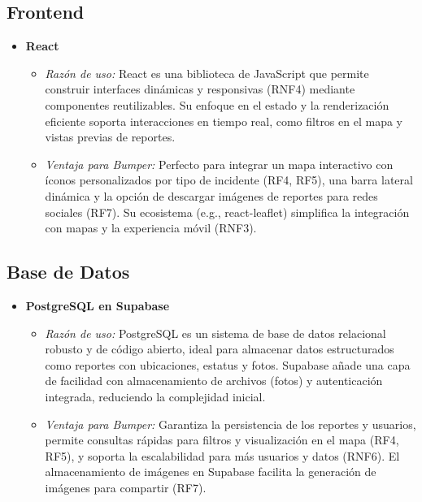 \subsection*{Frontend}
\begin{itemize}
    \item \textbf{React}
    \begin{itemize}
        \item \textit{Razón de uso:} React es una biblioteca de JavaScript que permite construir interfaces dinámicas y responsivas (RNF4) mediante componentes reutilizables. Su enfoque en el estado y la renderización eficiente soporta interacciones en tiempo real, como filtros en el mapa y vistas previas de reportes.
        \item \textit{Ventaja para Bumper:} Perfecto para integrar un mapa interactivo con íconos personalizados por tipo de incidente (RF4, RF5), una barra lateral dinámica y la opción de descargar imágenes de reportes para redes sociales (RF7). Su ecosistema (e.g., react-leaflet) simplifica la integración con mapas y la experiencia móvil (RNF3).
    \end{itemize}
\end{itemize}

\subsection*{Base de Datos}
\begin{itemize}
    \item \textbf{PostgreSQL en Supabase}
    \begin{itemize}
        \item \textit{Razón de uso:} PostgreSQL es un sistema de base de datos relacional robusto y de código abierto, ideal para almacenar datos estructurados como reportes con ubicaciones, estatus y fotos. Supabase añade una capa de facilidad con almacenamiento de archivos (fotos) y autenticación integrada, reduciendo la complejidad inicial.
        \item \textit{Ventaja para Bumper:} Garantiza la persistencia de los reportes y usuarios, permite consultas rápidas para filtros y visualización en el mapa (RF4, RF5), y soporta la escalabilidad para más usuarios y datos (RNF6). El almacenamiento de imágenes en Supabase facilita la generación de imágenes para compartir (RF7).
    \end{itemize}
\end{itemize}

